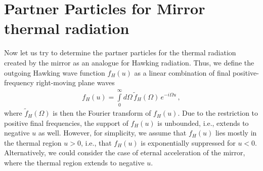 \documentclass[aps,prd,showpacs,amssymb,nofootinbib,12pt]{revtex4-2}
\newcommand{\bea}{\begin{eqnarray}}
\newcommand{\ea}{\end{eqnarray}}
\begin{document}
\section{Partner Particles for Mirror thermal radiation}

Now let us try to determine the partner particles for the thermal 
radiation created by the mirror as an analogue for Hawking radiation. 
%
Thus, we define the outgoing Hawking wave function $f_H(u)$ as a linear 
combination of final positive-frequency right-moving plane waves 
%
\bea
\label{Hawking-mode}
f_H(u)=\int\limits_0^\infty d\Omega\,\tilde f_H(\Omega)\, e^{-i\Omega u}
\,,
\ea
%
where $\tilde f_H(\Omega)$ is then the Fourier transform of $f_H(u)$.
%
Due to the restriction to positive final frequencies, the support of $f_H(u)$ 
is unbounded, i.e., extends to negative $u$ as well. 
%
However, for simplicity, we assume that $f_H(u)$ lies mostly in the thermal 
region $u>0$, i.e., that $f_H(u)$ is exponentially suppressed for $u<0$. 
%
Alternatively, we could consider the case of eternal acceleration of the 
mirror, where the thermal region extends to negative $u$. 
\end{document}
